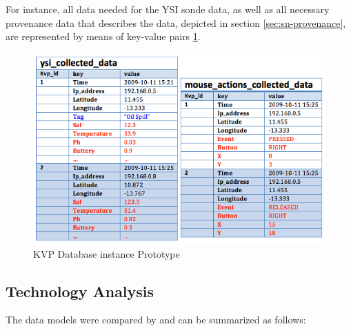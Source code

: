 For instance, all data needed for the YSI sonde data, as well as all necessary
provenance data that describes the data, depicted in section
\ref{sec:sn-provenance}, are represented by means of key-value pairs
\ref{fig:persistence-example-kvp}.

\begin{figure}[!h]
  \centering
  \includegraphics[scale=0.5]{../diagrams/persistence-example-kvp}
  \caption{KVP Database instance Prototype}
  \label{fig:persistence-example-kvp}
\end{figure}

\subsection{Technology Analysis}

The data models were compared by \cite{db-is-rdbs-dommed} and can be summarized
as follows:

